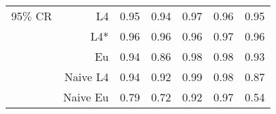 \documentclass[a4paper,12pt,twoside]{book}
\begin{document}
\begin{table}[H]
\begin{tabular}{crrrrrr}
 {\color{blue} 95$\%$ CR }& L4  &0.95 & 0.94 & 0.97 & 0.96 & 0.95 \\ 
  
  &L4*  &0.96 & 0.96 & 0.96 & 0.97 & 0.96 \\ 
  
&Eu &  0.94 & 0.86 & 0.98 & 0.98 & 0.93 \\ 
  
  
&Naive L4&    
 
  0.94 & 0.92 & 0.99 & 0.98 & 0.87 \\ 

&Naive Eu &  0.79 & 0.72 & 0.92 & 0.97 & 0.54 \\  
  
\end{tabular}

\end{table}
\end{document}
